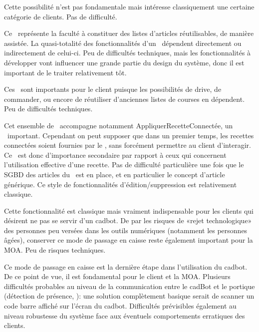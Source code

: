 \startnote
{} Cette possibilité n'est pas fondamentale mais intéresse classiquement une certaine catégorie de clients.
 Pas de difficulté.
\stopnote

\startnote
{} Ce \cu\ représente la faculté à constituer des listes d'articles réutilisables, de manière assistée.
La quasi-totalité des fonctionnalités d'un \fm\ dépendent directement ou indirectement de celui-ci.
 Peu de difficultés techniques, mais les fonctionnalités à développer vont influencer une grande partie du design du système, donc il est important de le traiter relativement tôt.
\stopnote

\startnote
{} Ces \cu\ sont importants pour le client puisque les possibilités de drive, de commander, ou encore de réutiliser d'anciennes listes de courses en dépendent.
 Peu de difficultés techniques.
\stopnote

\startnote
{} Cet ensemble de \cu\ accompagne notamment AppliquerRecetteConnectée, un \cu\ important.
Cependant on peut supposer que dans un premier temps, les recettes connectées soient fournies par le \fm, sans forcément permettre au client d'interagir.
Ce \cu\ est donc d'importance secondaire par rapport à ceux qui concernent l'utilisation effective d'une recette.
 Pas de difficulté particulière une fois que le SGBD des articles du \fm\ est en place, et en particulier le concept d'article générique.
Ce style de fonctionnalités d'édition/suppression est relativement classique.
\stopnote

\startnote
{} Cette fonctionnalité est classique mais vraiment indispensable pour les clients qui désirent ne pas se servir d'un cadbot.
De par les risques de «rejet technologique» des personnes peu versées dans les outils numériques (notamment les personnes âgées), conserver ce mode de passage en caisse reste également important pour la MOA.
 Peu de risques techniques.
\stopnote

\startnote
{} Ce mode de passage en caisse est la dernière étape dans l'utilisation du cadbot.
De ce point de vue, il est fondamental pour le client et la MOA.
 Plusieurs difficultés probables au niveau de la communication entre le cadBot et le portique (détection de présence, \etc): une solution complètement basique serait de scanner un code barre affiché sur l'écran du cadbot.
Difficultés prévisibles également au niveau robustesse du système face aux éventuels comportements erratiques des clients.
\stopnote


